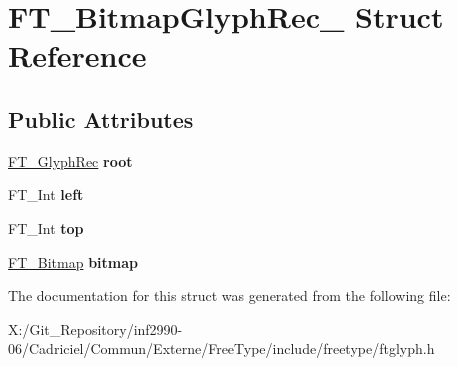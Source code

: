 \hypertarget{struct_f_t___bitmap_glyph_rec__}{\section{F\-T\-\_\-\-Bitmap\-Glyph\-Rec\-\_\- Struct Reference}
\label{struct_f_t___bitmap_glyph_rec__}
}
\subsection*{Public Attributes}
\begin{DoxyCompactItemize}
\item 
\hypertarget{struct_f_t___bitmap_glyph_rec___ac3970353fbc0fe3d4c59c3fd608140f3}{\hyperlink{struct_f_t___glyph_rec__}{F\-T\-\_\-\-Glyph\-Rec} {\bfseries root}}\label{struct_f_t___bitmap_glyph_rec___ac3970353fbc0fe3d4c59c3fd608140f3}

\item 
\hypertarget{struct_f_t___bitmap_glyph_rec___a6cfd2d89af7b6be4af886047c9cb7e0a}{F\-T\-\_\-\-Int {\bfseries left}}\label{struct_f_t___bitmap_glyph_rec___a6cfd2d89af7b6be4af886047c9cb7e0a}

\item 
\hypertarget{struct_f_t___bitmap_glyph_rec___a25fc81296678d6a2d064843c01bc05f7}{F\-T\-\_\-\-Int {\bfseries top}}\label{struct_f_t___bitmap_glyph_rec___a25fc81296678d6a2d064843c01bc05f7}

\item 
\hypertarget{struct_f_t___bitmap_glyph_rec___a16ecd0725920f8d5ad4c14e9448126ad}{\hyperlink{struct_f_t___bitmap__}{F\-T\-\_\-\-Bitmap} {\bfseries bitmap}}\label{struct_f_t___bitmap_glyph_rec___a16ecd0725920f8d5ad4c14e9448126ad}

\end{DoxyCompactItemize}


The documentation for this struct was generated from the following file\-:\begin{DoxyCompactItemize}
\item 
X\-:/\-Git\-\_\-\-Repository/inf2990-\/06/\-Cadriciel/\-Commun/\-Externe/\-Free\-Type/include/freetype/ftglyph.\-h\end{DoxyCompactItemize}
